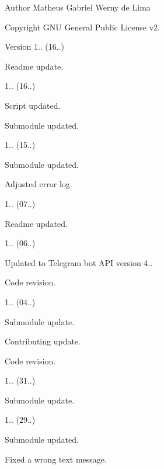 \begin{DoxyAuthor}{Author}
Matheus Gabriel Werny de Lima 
\end{DoxyAuthor}
\begin{DoxyCopyright}{Copyright}
G\+NU General Public License v2. 
\end{DoxyCopyright}
\begin{DoxyVersion}{Version}
1.. (16..)
\begin{DoxyItemize}
\item Readme update. 
\end{DoxyItemize}

1.. (16..)
\begin{DoxyItemize}
\item Script updated.
\item Submodule updated. 
\end{DoxyItemize}

1.. (15..)
\begin{DoxyItemize}
\item Submodule updated.
\item Adjusted error log. 
\end{DoxyItemize}

1.. (07..)
\begin{DoxyItemize}
\item Readme updated. 
\end{DoxyItemize}

1.. (06..)
\begin{DoxyItemize}
\item Updated to Telegram bot A\+PI version 4..
\item Code revision. 
\end{DoxyItemize}

1.. (04..)
\begin{DoxyItemize}
\item Submodule update.
\item Contributing update.
\item Code revision. 
\end{DoxyItemize}

1.. (31..)
\begin{DoxyItemize}
\item Submodule update. 
\end{DoxyItemize}

1.. (29..)
\begin{DoxyItemize}
\item Submodule updated.
\item Fixed a wrong text message. 
\end{DoxyItemize}


\end{DoxyVersion}
